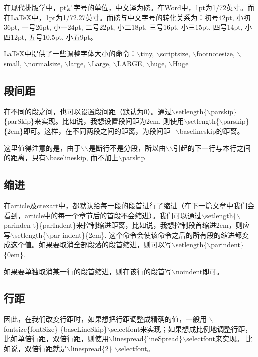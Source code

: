 \documentclass[12pt]{book}
\begin{document}
在现代排版学中，pt是字号的单位，中文译为磅。在Word中，1pt为1/72英寸。而在LaTeX中，1pt为1/72.27英寸。而磅与中文字号的转化关系为：初号42pt, 小初36pt, 一号26pt, 小一24pt, 二号22pt, 小二18pt, 三号16pt, 小三15pt, 四号14pt, 小四12pt, 五号10.5pt, 小五9pt。

LaTeX中提供了一些调整字体大小的命令：$\backslash$tiny, $\backslash$scriptsize, $\backslash$footnotesize, $\backslash$small, $\backslash$normalsize, $\backslash$large, $\backslash$Large, $\backslash$LARGE, $\backslash$huge, $\backslash$Huge



\subsection{段间距}

在不同的段之间，也可以设置段间距（默认为0）。通过$\backslash$setlength\{$\backslash$parskip\}\{parSkip\}来实现。比如说，我想设置段间距为2em, 则使用$\backslash$setlength\{$\backslash$parskip\}\{2em\}即可。这样，在不同两段之间的距离，为段间距+$\backslash$baselineskip的距离。

这里值得注意的是，由于$\backslash$$\backslash$是断行不是分段，所以由$\backslash$$\backslash$引起的下一行与本行之间的距离，只有$\backslash$baselineskip, 而不加上$\backslash$parskip

\subsection{缩进}

在article及ctexart中，都默认给每一段的段首进行了缩进（在下一篇文章中我们会看到，article中的每一个章节后的首段不会缩进）。我们可以通过$\backslash$setlength\{$\backslash$parinden t\}\{parIndent\}来控制缩进距离，比如说，我想控制段首缩进2em，则应写$\backslash$setlength\{$\backslash$par indent\}\{2em\}. 这个命令会使该命令之后的所有段的缩进都变成这个值。如果要取消全部段落的段首缩进，则可以写$\backslash$setlength\{$\backslash$parindent\}\{0em\}.

如果要单独取消某一行的段首缩进，则在该行的段首写$\backslash$noindent即可。

\subsection{行距}

因此，在我们改变行距时，如果想把行距调整成精确的值，一般用 $\backslash$fontsize\{fontSize\} \{baseLineSkip\}$\backslash$selectfont来实现；如果想成比例地调整行距，比如单倍行距，双倍行距，则使用$\backslash$linespread\{lineSpread\}$\backslash$selectfont来实现。 比如说，双倍行距就是$\backslash$linespread\{2\} $\backslash$selectfont。
\end{document}
